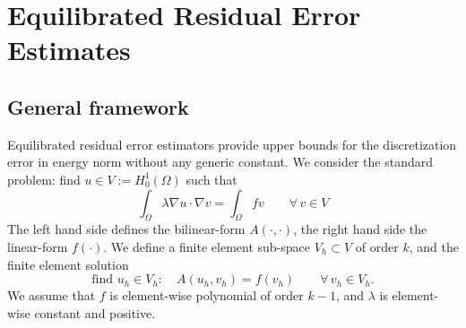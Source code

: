 








% 

\section{Equilibrated Residual Error Estimates}

\subsection{General framework}
Equilibrated residual error estimators provide upper bounds for the discretization error in energy norm without any generic constant.
We consider the standard problem: find $u \in V := H_0^1(\Omega)$ such that
$$
\int_\Omega \lambda \nabla u \cdot \nabla v = \int_\Omega f v \qquad \forall \, v \in V
$$
The left hand side defines the bilinear-form $A(\cdot, \cdot)$, the right hand side the linear-form $f(\cdot)$. We define a finite element sub-space $V_h \subset V$ of order $k$, and the finite element solution
$$
\text{find } u_h \in V_h: \quad A(u_h, v_h) = f(v_h) \qquad \forall \, v_h \in V_h.
$$
We assume that $f$ is element-wise polynomial of order $k-1$, and $\lambda$ is element-wise constant and positive.

